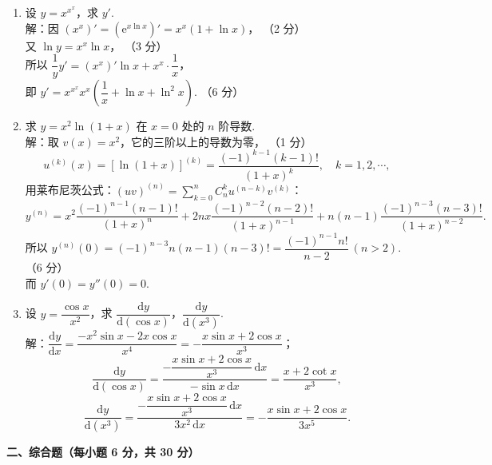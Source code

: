 \documentclass[a4paper,11pt]{ctexart}
\newcommand{\e}{\mathrm{e}}
\newcommand{\dd}{\mathrm{d}}
\newcommand{\score}[1]{\hfill（#1）}
\begin{document}
\begin{enumerate}[label=\arabic*., leftmargin=2em, itemsep=1.0em, topsep=0.5em]
  \item 设 $y = x^{x^x}$，求 $y'$.\\[0.3em]
  解：因 $(x^x)' = (\e^{x\ln x})' = x^x(1 + \ln x)$， \score{2 分}\\[0.2em]
  又 $\ln y = x^x \ln x$， \score{3 分}\\[0.2em]
  所以 $\dfrac{1}{y}y' = (x^x)'\ln x + x^x \cdot \dfrac{1}{x}$，\\[0.2em]
  即 $y' = x^{x^x} x^x\left(\dfrac{1}{x} + \ln x + \ln^2 x\right)$. \score{6 分}

  \item 求 $y = x^2 \ln(1+x)$ 在 $x = 0$ 处的 $n$ 阶导数.\\[0.3em]
  解：取 $v(x) = x^2$，它的三阶以上的导数为零， \score{1 分}
  \[
    u^{(k)}(x) = [\ln(1+x)]^{(k)} = \frac{(-1)^{k-1}(k-1)!}{(1+x)^k},\quad k = 1, 2, \cdots, \tag*{（3 分）}
  \]
  用莱布尼茨公式：$(uv)^{(n)} = \sum\limits_{k=0}^{n} C_n^k u^{(n-k)} v^{(k)}$：
  \[
    y^{(n)} = x^2\frac{(-1)^{n-1}(n-1)!}{(1+x)^n} + 2nx\frac{(-1)^{n-2}(n-2)!}{(1+x)^{n-1}} + n(n-1)\frac{(-1)^{n-3}(n-3)!}{(1+x)^{n-2}}.
  \]
  所以 $y^{(n)}(0) = (-1)^{n-3}n(n-1)(n-3)! = \dfrac{(-1)^{n-1} n!}{n - 2}~(n > 2)$. \score{6 分}\\[0.3em]
  而 $y'(0) = y''(0) = 0$.

  \item 设 $y = \dfrac{\cos x}{x^2}$，求 $\dfrac{\dd y}{\dd(\cos x)}$，$\dfrac{\dd y}{\dd(x^3)}$.\\[0.3em]
  解：$\dfrac{\dd y}{\dd x} = \dfrac{-x^2\sin x - 2x\cos x}{x^4} = -\dfrac{x\sin x + 2\cos x}{x^3}$；
  \[
    \frac{\dd y}{\dd(\cos x)} = \frac{-\dfrac{x\sin x + 2\cos x}{x^3}\,\dd x}{-\sin x\,\dd x} = \frac{x + 2\cot x}{x^3}, \tag*{（3 分）}
  \]
  \[
    \frac{\dd y}{\dd(x^3)} = \frac{-\dfrac{x\sin x + 2\cos x}{x^3}\,\dd x}{3x^2\,\dd x} = -\frac{x\sin x + 2\cos x}{3x^5}. \tag*{（6 分）}
  \]
\end{enumerate}

\vspace{0.8em}

\textbf{二、综合题（每小题 6 分，共 30 分）}
\end{document}
